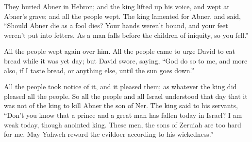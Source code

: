 {They buried Abner in Hebron; and the king lifted up his voice, and wept at Abner’s grave; and all the people wept.
The king lamented for Abner, and said, “Should Abner die as a fool dies?
Your hands weren’t bound, and your feet weren’t put into fetters. As a man falls before the children of iniquity, so you fell.”
\par }{\PP All the people wept again over him.
All the people came to urge David to eat bread while it was yet day; but David swore, saying, “God do so to me, and more also, if I taste bread, or anything else, until the sun goes down.”
\par }{\PP {}All the people took notice of it, and it pleased them; as whatever the king did pleased all the people.
So all the people and all Israel understood that day that it was not of the king to kill Abner the son of Ner.
The king said to his servants, “Don’t you know that a prince and a great man has fallen today in Israel?
I am weak today, though anointed king. These men, the sons of Zeruiah are too hard for me. May Yahweh reward the evildoer according to his wickedness.”

}
